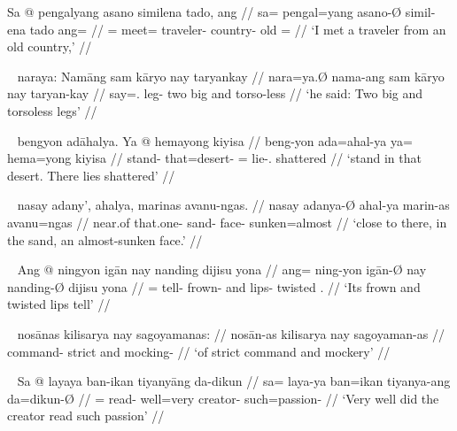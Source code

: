 
\ex\begingl
	\gla Sa @ pengalyang asano similena tado, ang //
	\glb sa= pengal=yang asano-Ø simil-ena tado ang= //
	\glc \PatT{}= meet=\Fsg{} traveler-\Top{} country-\Gen{} old \AgtT{}= //
	\glft `I met a traveler from an old country,' //
\endgl\xe

\ex~\begingl
	\gla naraya: Namāng sam kāryo nay taryankay //
	\glb nara=ya.Ø nama-ang sam kāryo nay taryan-kay //
	\glc say=\TsgM{}.\Top{} leg-\Aarg{} two big and torso-less //
	\glft `he said: Two big and torsoless legs' //
\endgl\xe

\ex~\begingl
	\gla bengyon adāhalya. Ya @ hemayong kiyisa //
	\glb beng-yon ada=ahal-ya ya= hema=yong kiyisa //
	\glc stand-\TplN{} that=desert-\Loc{} \LocT{}= lie-\TsgN{}.\Aarg{} 
		shattered //
	\glft `stand in that desert. There lies shattered' //
\endgl\xe

\ex~\begingl
	\gla nasay adany', ahalya, marinas avanu-ngas. //
	\glb nasay adanya-Ø ahal-ya marin-as avanu=ngas //
	\glc near.of that.one-\Top{} sand-\Loc{} face-\Parg{} sunken=almost //
	\glft `close to there, in the sand, an almost-sunken face.' //
\endgl\xe

\ex~\begingl
	\gla Ang @ ningyon igān nay nanding dijisu yona //
	\glb ang= ning-yon igān-Ø nay nanding-Ø dijisu yona //
	\glc \AgtT{}= tell-\TplN{} frown-\Top{} and lips-\Top{} twisted 
		\TsgN{}.\Gen{} //
	\glft `Its frown and twisted lips tell' //
\endgl\xe

\ex~\begingl
	\gla nosānas kilisarya nay sagoyamanas: //
	\glb nosān-as kilisarya nay sagoyaman-as //
	\glc command-\Parg{} strict and mocking-\Parg{} //
	\glft `of strict command and mockery' //
\endgl\xe

\ex~\begingl
	\gla Sa @ layaya ban-ikan tiyanyāng da-dikun //
	\glb sa= laya-ya ban=ikan tiyanya-ang da=dikun-Ø //
	\glc \PatT{}= read-\TsgM{} well=very creator-\Aarg{} such=passion-\Top{} //
	\glft `Very well did the creator read such passion' //
\endgl\xe

